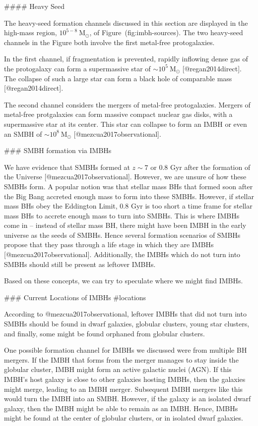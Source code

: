 {{{{{{{{{{{{{#### Heavy Seed

The heavy-seed formation channels discussed in this section are
displayed in the high-mass region, $10^{5-8} \ \text{M}_{\odot}$, of
Figure~\@ref(fig:imbh-sources). The two heavy-seed channels in the
Figure both involve the first metal-free protogalaxies.

In the first channel, if fragmentation is prevented, rapidly inflowing
dense gas of the protogalaxy can form a supermassive star of  $\sim
10^{5} \ \text{M}_{\odot}$ [@regan2014direct]. The collapse of such a
large star can form a black hole of comparable mass [@regan2014direct].

The second channel considers the mergers of metal-free protogalaxies.
Mergers of metal-free protgalaxies can form massive compact nuclear
gas disks, with a supermassive star at its center. This star can
collapse to form an IMBH or even an SMBH of  $\sim10^{8} \
\text{M}_{\odot}$ [@mezcua2017observational].



### SMBH formation via IMBHs

We have evidence that SMBHs formed at $z\sim7$ or 0.8 Gyr after the
formation of the Universe [@mezcua2017observational]. However, we are
unsure of how these SMBHs form. A popular notion was that stellar mass
BHs that formed soon after the Big Bang accreted enough mass to form
into these SMBHs. However, if stellar mass BHs obey the Eddington
Limit, 0.8 Gyr is too short a time frame for stellar mass BHs to
accrete enough mass to turn into SMBHs. This is where IMBHs come in --
instead of stellar mass BH, there might have been IMBH in the early
universe as the seeds of SMBHs. Hence several formation scenarios of
SMBHs propose that they pass through a life stage in which they are
IMBHs [@mezcua2017observational]. Additionally, the IMBHs which do not
turn into SMBHs should still be present as leftover IMBHs.


Based on these concepts, we can try to speculate where we might find
IMBHs.


### Current Locations of IMBHs {#locations}

According to @mezcua2017observational, leftover IMBHs that did not turn
into SMBHs should be found in dwarf galaxies, globular clusters, young
star clusters, and finally, some might be found orphaned from globular
clusters.

One possible formation channel for IMBHs we discussed were from multiple
BH mergers. If the IMBH that forms from the merger manages to stay
inside the globular cluster, IMBH might form an active galactic nuclei
(AGN). If this IMBH's host galaxy is close to other galaxies hosting
IMBHs, then the galaxies might merge, leading to an IMBH merger.
Subsequent IMBH mergers like this would turn the IMBH into an SMBH.
However, if the galaxy is an isolated dwarf galaxy, then the IMBH might
be able to remain as an IMBH. Hence, IMBHs might be found at the center
of globular clusters, or in isolated dwarf galaxies.

}}}}}}}}}}}}}
